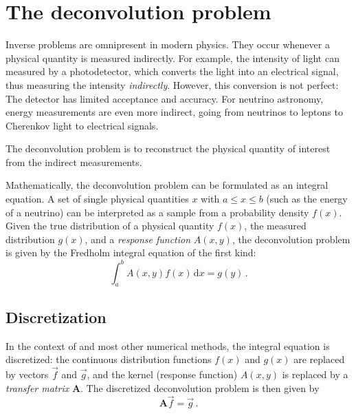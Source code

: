 \section{The deconvolution problem} %
Inverse problems are omnipresent in modern physics.
They occur whenever a physical quantity is measured indirectly.
For example,
the intensity of light can measured by a photodetector,
  which converts the light into an electrical signal,
    thus measuring the intensity \emph{indirectly}.
However,
this conversion is not perfect:
The detector has limited acceptance and accuracy.
For neutrino astronomy,
  energy measurements are even more indirect,
    going from neutrinos to leptons to Cherenkov light to electrical signals.

The deconvolution problem is to reconstruct the physical quantity of interest
  from the indirect measurements.

Mathematically,
the deconvolution problem can be formulated as an integral equation.
%
A set of single physical quantities $x$
  with $a \leq x \leq b$ %
  (such as the energy of a neutrino)
can be interpreted as a sample from a probability density $f(x)$.
%
Given
  the true distribution of a physical quantity $f(x)$,
  the measured distribution $g(x)$,
  and a \emph{response function} $A(x, y)$,
the deconvolution problem is given by
the Fredholm integral equation of the first kind: \cite{blobel_deconvolution}
\begin{equation}
  \label{eq:deconvolution_problem:fredholm}
  \int_a^b A(x, y) f(x) \, \mathrm{d}x = g(y) \, .
\end{equation}


\subsection{Discretization}
In the context of \dsea{} and most other numerical methods,
the integral equation is discretized:
  the continuous distribution functions $f(x)$ and $g(x)$ are replaced by vectors $\vec{f}$ and $\vec{g}$,
  and the kernel (response function) $A(x, y)$ is replaced by a \emph{transfer matrix} $\symbf{A}$.
%
The discretized deconvolution problem is then given by
\begin{equation}
  \label{eq:deconvolution_problem:discretized}
  \symbf{A} \vec{f} = \vec{g} \, .
\end{equation}

